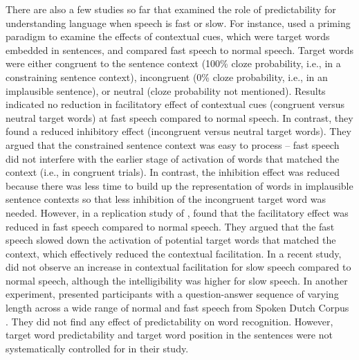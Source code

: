 \documentclass[a4paper, nobind]{templates/ociamthesis}
\begin{document}
There are also a few studies so far that examined the role of predictability for understanding language when speech is fast or slow.
For instance, \textcite{Aydelott2004} used a priming paradigm to examine the effects of contextual cues, which were target words embedded in sentences, and compared fast speech to normal speech.
Target words were either congruent to the sentence context (100\% cloze probability, i.e., in a constraining sentence context), incongruent (0\% cloze probability, i.e., in an implausible sentence), or neutral (cloze probability not mentioned). Results indicated no reduction in facilitatory effect of contextual cues (congruent versus neutral target words) at fast speech compared to normal speech.
In contrast, they found a reduced inhibitory effect (incongruent versus neutral target words).
They argued that the constrained sentence context was easy to process -- fast speech did not interfere with the earlier stage of activation of words that matched the context (i.e., in congruent trials).
In contrast, the inhibition effect was reduced because there was less time to build up the representation of words in implausible sentence contexts so that less inhibition of the incongruent target word was needed.
However, in a replication study of \textcite{Aydelott2004}, \textcite{Goy2013} found that the facilitatory effect was reduced in fast speech compared to normal speech.
They argued that the fast speech slowed down the activation of potential target words that matched the context, which effectively reduced the contextual facilitation.
In a recent study, \textcite{Winn2021b} did not observe an increase in contextual facilitation for slow speech compared to normal speech, although the intelligibility was higher for slow speech.
In another experiment, \textcite{Koch2016a} presented participants with a question-answer sequence of varying length across a wide range of normal and fast speech from Spoken Dutch Corpus \autocite{Oostdijk2000}.
They did not find any effect of predictability on word recognition. However, target word predictability and target word position in the sentences were not systematically controlled for in their study.
\end{document}
